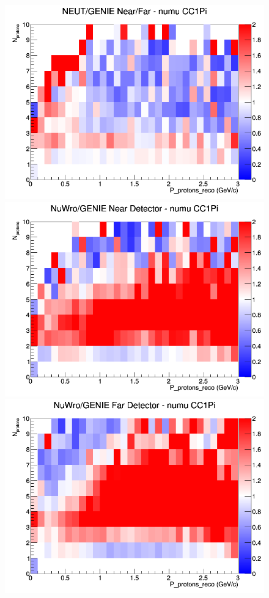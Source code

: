 \begin{figure}[h]
\endminipage
{}
\includegraphics[width=\linewidth]{eff_N_P/FGT/protons/ratios/CC1Pi_NEUT_GENIE_numu_NF_N_P.png}
\endminipage
\newline
{}
\includegraphics[width=\linewidth]{eff_N_P/FGT/protons/ratios/CC1Pi_NuWro_GENIE_numu_near_N_P.png}
\endminipage
{}
\includegraphics[width=\linewidth]{eff_N_P/FGT/protons/ratios/CC1Pi_NuWro_GENIE_numu_far_N_P.png}

\end{figure}
